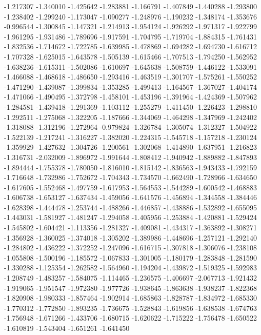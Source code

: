 -1.217307
-1.340010
-1.425642
-1.283881
-1.166791
-1.407849
-1.440288
-1.293800
-1.238402
-1.299240
-1.173047
-1.090277
-1.248976
-1.190232
-1.348174
-1.353676
-0.996544
-1.300845
-1.147321
-1.214913
-1.954124
-1.926292
-1.971317
-1.922799
-1.961295
-1.931486
-1.789696
-1.917591
-1.704795
-1.719704
-1.884315
-1.761431
-1.832536
-1.714672
-1.722785
-1.639985
-1.478869
-1.694282
-1.694730
-1.616712
-1.707328
-1.625015
-1.643578
-1.505139
-1.615466
-1.707513
-1.794250
-1.562952
-1.638236
-1.615311
-1.502086
-1.610697
-1.645638
-1.508759
-1.446122
-1.533091
-1.466088
-1.468618
-1.486650
-1.293416
-1.463519
-1.301707
-1.575261
-1.550252
-1.471290
-1.439087
-1.399834
-1.353285
-1.499413
-1.164567
-1.367027
-1.404174
-1.471066
-1.490495
-1.372798
-1.458101
-1.453196
-1.391964
-1.424369
-1.507962
-1.284581
-1.439418
-1.291369
-1.103112
-1.255279
-1.411450
-1.226423
-1.298810
-1.292511
-1.275068
-1.322205
-1.187666
-1.344069
-1.464298
-1.347969
-1.242402
-1.318088
-1.312196
-1.272964
-0.979824
-1.326784
-1.305074
-1.312327
-1.504922
-1.522139
-1.217241
-1.316227
-1.382020
-1.224315
-1.545718
-1.157218
-1.230124
-1.359929
-1.427632
-1.304726
-1.200561
-1.302068
-1.414890
-1.637951
-1.216823
-1.316731
-2.032009
-1.896972
-1.991644
-1.808412
-1.940942
-1.889882
-1.847893
-1.894444
-1.755378
-1.780050
-1.816010
-1.815142
-1.836563
-1.943433
-1.792159
-1.716648
-1.732986
-1.752672
-1.704343
-1.734570
-1.662490
-1.728966
-1.634650
-1.617605
-1.552468
-1.497759
-1.617953
-1.564553
-1.544289
-1.600542
-1.468883
-1.606738
-1.653127
-1.637434
-1.459056
-1.641576
-1.456894
-1.344558
-1.384446
-1.628398
-1.444478
-1.253744
-1.488266
-1.446857
-1.438886
-1.532892
-1.655095
-1.443031
-1.581927
-1.481247
-1.294058
-1.405956
-1.253884
-1.420881
-1.529424
-1.545802
-1.604421
-1.113356
-1.281327
-1.409081
-1.434317
-1.363892
-1.308271
-1.356928
-1.360025
-1.374018
-1.305202
-1.389986
-1.448696
-1.257121
-1.292140
-1.284802
-1.436222
-1.372252
-1.247096
-1.616715
-1.307818
-1.306076
-1.238108
-1.055808
-1.500196
-1.185572
-1.067833
-1.301005
-1.180179
-1.283848
-1.281590
-1.330288
-1.125354
-1.262582
-1.564960
-1.194204
-1.439872
-1.519325
-1.592983
-1.208749
-1.483257
-1.584075
-1.114465
-1.236575
-1.406697
-2.067713
-1.921432
-1.919065
-1.951547
-1.972380
-1.977726
-1.938645
-1.863638
-1.938237
-1.822368
-1.820908
-1.980333
-1.857464
-1.902914
-1.685863
-1.828787
-1.834972
-1.685330
-1.770312
-1.772850
-1.893235
-1.736675
-1.528843
-1.619856
-1.638538
-1.674763
-1.756948
-1.671266
-1.433706
-1.680715
-1.620622
-1.715222
-1.756478
-1.650522
-1.610819
-1.543404
-1.651261
-1.641450

